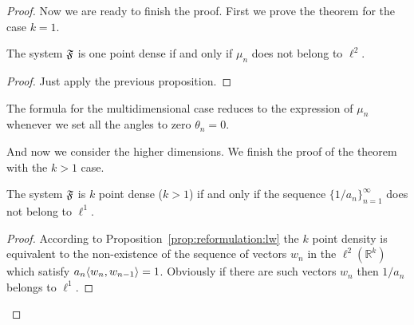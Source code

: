 \begin{proof}
    Now we are ready to finish the proof.
    First we prove the theorem for the case $k=1$.
    \begin{prop}
      The system $\mathfrak{F}$ is one point dense if and only if $\mu_n$ does not belong to $\ell^2$.
    \end{prop}
    \begin{proof}
      Just apply the previous proposition.
    \end{proof}

    The formula for the multidimensional case reduces to the expression of $\mu_n$ whenever we
      set all the angles to zero $\theta_n = 0$.

    And now we consider the higher dimensions.
    We finish the proof of the theorem with the $k > 1$ case.
    \begin{prop}
      The system $\mathfrak{F}$ is $k$ point dense ($k > 1$) if and only if the sequence $\{1/a_n\}_{n=1}^\infty$ does not belong to $\ell^1$.
    \end{prop}
    \begin{proof}
      According to Proposition~\ref{prop:reformulation:lw} the $k$ point density is equivalent to the non-existence of
        the sequence of vectors $w_n$ in the $\ell^2(\mathbb{R}^k)$ which satisfy $a_n \langle w_n, w_{n-1} \rangle = 1$.
      Obviously if there are such vectors $w_n$ then $1/a_n$ belongs to $\ell^1$.


\end{proof}
\end{proof}
